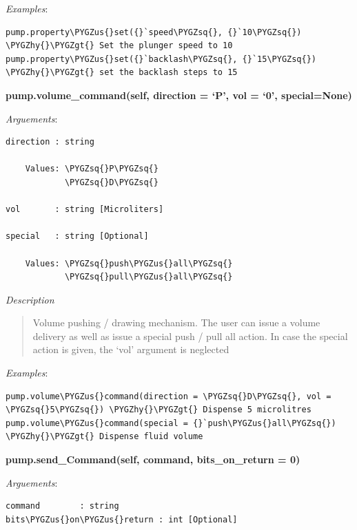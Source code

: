 \documentclass[letterpaper,10pt,english]{sphinxmanual}
\def\PYGZus{\char`\_}
\def\PYGZgt{\char`\>}
\def\PYGZhy{\char`\-}
\def\PYGZsq{\char`\'}
\begin{document}
\emph{Examples}:

\begin{Verbatim}[commandchars=\\\{\}]
pump.property\PYGZus{}set({}`speed\PYGZsq{}, {}`10\PYGZsq{}) \PYGZhy{}\PYGZgt{} Set the plunger speed to 10
pump.property\PYGZus{}set({}`backlash\PYGZsq{}, {}`15\PYGZsq{}) \PYGZhy{}\PYGZgt{} set the backlash steps to 15
\end{Verbatim}

\textbf{pump.volume\_command(self, direction = {}`P', vol = {}`0', special=None)}

\emph{Arguements}:

\begin{Verbatim}[commandchars=\\\{\}]
direction : string

    Values: \PYGZsq{}P\PYGZsq{}
            \PYGZsq{}D\PYGZsq{}

vol       : string [Microliters]

special   : string [Optional]

    Values: \PYGZsq{}push\PYGZus{}all\PYGZsq{}
            \PYGZsq{}pull\PYGZus{}all\PYGZsq{}
\end{Verbatim}

\emph{Description}
\begin{quote}

Volume pushing / drawing mechanism. The user can issue a volume delivery as well
as issue a special push / pull all action. In case the special action is given,
the  `vol' argument is neglected
\end{quote}

\emph{Examples}:

\begin{Verbatim}[commandchars=\\\{\}]
pump.volume\PYGZus{}command(direction = \PYGZsq{}D\PYGZsq{}, vol = \PYGZsq{}5\PYGZsq{}) \PYGZhy{}\PYGZgt{} Dispense 5 microlitres
pump.volume\PYGZus{}command(special = {}`push\PYGZus{}all\PYGZsq{}) \PYGZhy{}\PYGZgt{} Dispense fluid volume
\end{Verbatim}

\textbf{pump.send\_Command(self, command, bits\_on\_return = 0)}

\emph{Arguements}:

\begin{Verbatim}[commandchars=\\\{\}]
command        : string
bits\PYGZus{}on\PYGZus{}return : int [Optional]
\end{Verbatim}
\end{document}
